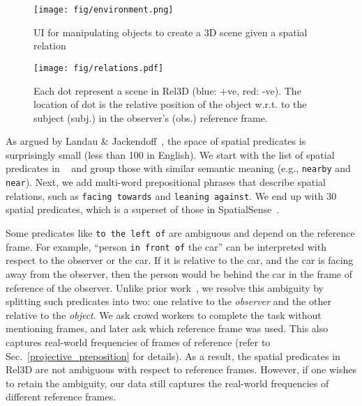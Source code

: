 \documentclass{article}
\newcommand{\smallsec}[1]{\noindent {\bf #1.}}
\newcommand\datasetname{Rel3D}
\newcommand\numpredicates{30}
\begin{document}
\begin{figure}[!tbp]
\RawFloats
\centering
\begin{minipage}[b]{\dimexpr.52\textwidth-1em}
\texttt{[image: fig/environment.png]}
\caption{UI for manipulating objects to create a 3D scene given a spatial relation}
\label{fig:ui}
\end{minipage}
\hfill
\begin{minipage}[b]{\dimexpr.5\textwidth-1em}
\texttt{[image: fig/relations.pdf]}
\caption{Each dot represent a scene in \datasetname{} (blue: +ve, red: -ve). The location of dot is the relative position of the object w.r.t. to the subject (subj.) in the observer's (obs.) reference frame.}
\label{fig:sample_3d}
\end{minipage}
\vspace{-0.5em}
\end{figure}
\smallsec{Predicate vocabulary}
As argued by Landau \& Jackendoff~\cite{landau1993and}, the space of spatial predicates is surprisingly small (less than 100 in English). We start with the list of spatial predicates in ~\cite{landau1993and} and group those with similar semantic meaning (e.g., \texttt{nearby} and \texttt{near}). Next, we add multi-word prepositional phrases that describe spatial relations, such as \texttt{facing towards} and \texttt{leaning against}. We end up with {\numpredicates } spatial predicates, which is a superset of those in SpatialSense~\cite{yang2019spatialsense}. 


Some predicates like \texttt{to the left of} are ambiguous and depend on the reference frame. For example, ``person \texttt{in front of} the car'' can be interpreted with respect to the observer or the car. If it is relative to the car, and the car is facing away from the observer, then the person would be behind the car in the frame of reference of the observer.
Unlike prior work~\cite{yang2019spatialsense}, we resolve this ambiguity by splitting such predicates into two: one relative to the \emph{observer} and the other relative to the \emph{object}. We ask crowd workers to complete the task without mentioning frames, and later ask which reference frame was used. This also captures real-world frequencies of frames of reference (refer to Sec.~\ref{projective_preposition} for details). As a result, the spatial predicates in {\datasetname } are not ambiguous with respect to reference frames. However, if one wishes to retain the ambiguity, our data still captures the real-world frequencies of different reference frames. 
\end{document}
